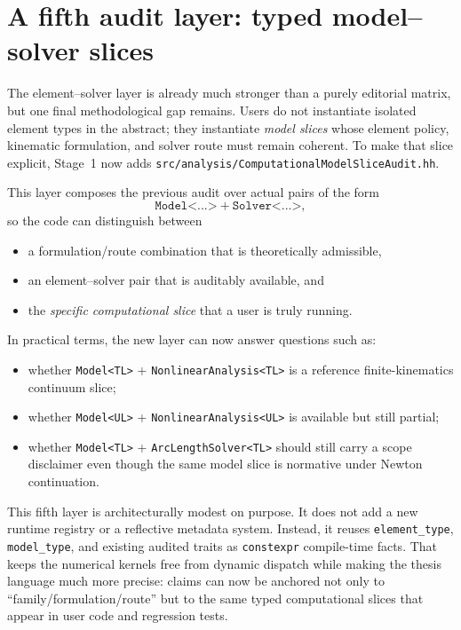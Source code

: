 \section{A fifth audit layer: typed model--solver slices}

The element--solver layer is already much stronger than a purely editorial
matrix, but one final methodological gap remains.  Users do not instantiate
isolated element types in the abstract; they instantiate \emph{model slices}
whose element policy, kinematic formulation, and solver route must remain
coherent.  To make that slice explicit, Stage~1 now adds
\texttt{src/analysis/ComputationalModelSliceAudit.hh}.

This layer composes the previous audit over actual pairs of the form
\[
\texttt{Model<...>} + \texttt{Solver<...>},
\]
so the code can distinguish between
\begin{itemize}
  \item a formulation/route combination that is theoretically admissible,
  \item an element--solver pair that is auditably available, and
  \item the \emph{specific computational slice} that a user is truly running.
\end{itemize}

In practical terms, the new layer can now answer questions such as:
\begin{itemize}
  \item whether \texttt{Model<TL>} + \texttt{NonlinearAnalysis<TL>} is a
  reference finite-kinematics continuum slice;
  \item whether \texttt{Model<UL>} + \texttt{NonlinearAnalysis<UL>} is
  available but still partial;
  \item whether \texttt{Model<TL>} + \texttt{ArcLengthSolver<TL>} should still
  carry a scope disclaimer even though the same model slice is normative under
  Newton continuation.
\end{itemize}

This fifth layer is architecturally modest on purpose.  It does not add a new
runtime registry or a reflective metadata system.  Instead, it reuses
\texttt{element\_type}, \texttt{model\_type}, and existing audited traits as
\texttt{constexpr} compile-time facts.  That keeps the numerical kernels free
from dynamic dispatch while making the thesis language much more precise:
claims can now be anchored not only to ``family/formulation/route'' but to the
same typed computational slices that appear in user code and regression tests.

